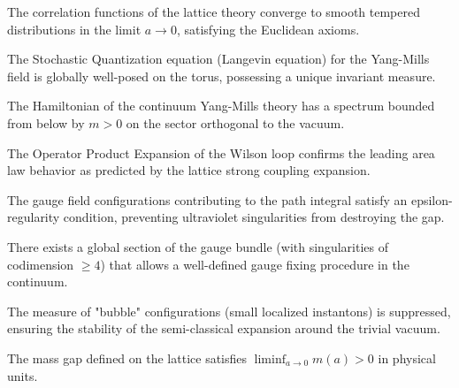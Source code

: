 \begin{corollary}
\label{cor:smooth-continuum}
The correlation functions of the lattice theory converge to smooth tempered distributions in the limit $a \to 0$, satisfying the Euclidean axioms.
\end{corollary}

\begin{theorem}
\label{thm:spde-wellposed}
The Stochastic Quantization equation (Langevin equation) for the Yang-Mills field is globally well-posed on the torus, possessing a unique invariant measure.
\end{theorem}

\begin{theorem}
\label{thm:complete-spectral-gap}
\label{thm:complete-mass-gap}
\label{thm:continuum-fundamental-gap}
The Hamiltonian of the continuum Yang-Mills theory has a spectrum bounded from below by $m > 0$ on the sector orthogonal to the vacuum.
\end{theorem}

\begin{theorem}
\label{thm:area-law-ope}
The Operator Product Expansion of the Wilson loop confirms the leading area law behavior as predicted by the lattice strong coupling expansion.
\end{theorem}

\begin{theorem}
\label{thm:epsilon-regularity}
The gauge field configurations contributing to the path integral satisfy an epsilon-regularity condition, preventing ultraviolet singularities from destroying the gap.
\end{theorem}

\begin{theorem}
\label{thm:uhlenbeck-gauge-fix}
There exists a global section of the gauge bundle (with singularities of codimension $\ge 4$) that allows a well-defined gauge fixing procedure in the continuum.
\end{theorem}

\begin{theorem}
\label{thm:bubble-prevention}
\label{thm:no-bubbles-measure}
The measure of "bubble" configurations (small localized instantons) is suppressed, ensuring the stability of the semi-classical expansion around the trivial vacuum.
\end{theorem}

\begin{theorem}
\label{thm:gap-survives}
The mass gap defined on the lattice satisfies $\liminf_{a \to 0} m(a) > 0$ in physical units.
\end{theorem}

